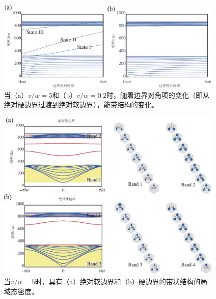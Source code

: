 \begin{figure}[h!]
  \centering
  \includegraphics[width=1\textwidth]{images/fig3-7.eps} 
  \caption{当（a）\(v/w = 5\)和（b）\(v/w = 0.2\)时，随着边界对角项的变化（即从绝对硬边界过渡到绝对软边界），能带结构的变化。}
  \label{fig_3_7}
\end{figure}

\begin{figure}[h!]
  \centering
  \includegraphics[width=1\textwidth]{images/fig3-8.eps} 
  \caption{当\(v/w = 5\)时，具有（a）绝对软边界和（b）硬边界的带状结构的局域态密度。}
  \label{fig_3_8}
\end{figure}


